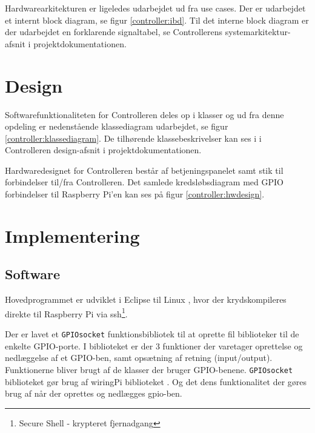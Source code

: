 Hardwarearkitekturen er ligeledes udarbejdet ud fra use cases. Der er udarbejdet et internt block diagram, se figur \ref{controller:ibd}. Til det interne block diagram er der udarbejdet en forklarende signaltabel, se Controllerens systemarkitektur-afsnit i projektdokumentationen.



\section{Design}
\label{ctrl_design}

Softwarefunktionaliteten for Controlleren deles op i klasser og ud fra denne opdeling er nedenstående klassediagram udarbejdet, se figur \ref{controller:klassediagram}. De tilhørende klassebeskrivelser kan ses i i Controlleren design-afsnit i projektdokumentationen.


Hardwaredesignet for Controlleren består af betjeningspanelet samt stik til forbindelser til/fra Controlleren. Det samlede kredsløbsdiagram med GPIO forbindelser til Raspberry Pi'en kan ses på figur \ref{controller:hwdesign}.


\section{Implementering}
\label{ctrl_implementering}

\subsection*{Software}

Hovedprogrammet er udviklet i Eclipse til Linux \citep{website:eclipsekepler}, hvor der krydskompileres direkte til Raspberry Pi via ssh\footnote{Secure Shell - krypteret fjernadgang}.

Der er lavet et \verb+GPIOsocket+ funktionsbibliotek til at oprette fil biblioteker til de enkelte GPIO-porte. I biblioteket er der 3 funktioner der varetager oprettelse og nedlæggelse af et GPIO-ben, samt opsætning af retning (input/output). Funktionerne bliver brugt af de klasser der bruger GPIO-benene. \verb+GPIOsocket+ biblioteket gør brug af wiringPi biblioteket \citep{website:wiringpi}. Og det dens funktionalitet der gøres brug af når der oprettes og nedlægges gpio-ben.

